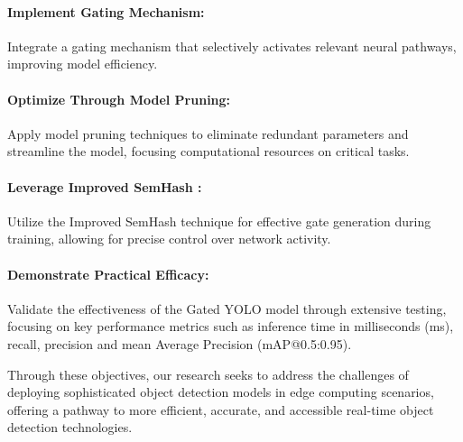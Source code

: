 \paragraph{Implement Gating Mechanism:} Integrate a gating mechanism that selectively activates relevant neural pathways, improving model efficiency.

\paragraph{Optimize Through Model Pruning:} Apply model pruning techniques to eliminate redundant parameters and streamline the model, focusing computational resources on critical tasks.

\paragraph{Leverage Improved SemHash \cite{kaiser2018discrete}:} Utilize the Improved SemHash technique for effective gate generation during training, allowing for precise control over network activity.

\paragraph{Demonstrate Practical Efficacy:} Validate the effectiveness of the Gated YOLO model through extensive testing, focusing on key performance metrics such as inference time in milliseconds (ms), recall, precision and mean Average Precision (mAP@0.5:0.95).

Through these objectives, our research seeks to address the challenges of deploying sophisticated object detection models in edge computing scenarios, offering a pathway to more efficient, accurate, and accessible real-time object detection technologies.

\clearpage

